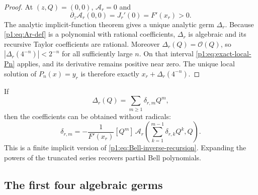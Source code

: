 \documentclass[11pt,oneside]{article}
\numberwithin{equation}{section}
\theoremstyle{definition}
\theoremstyle{remark}
\newcommand{\bigO}{\mathcal O}
\begin{document}
\begin{proof}
At $(z,Q)=(0,0)$, $\mathcal A_r=0$ and
\[
 \partial_z\mathcal A_r(0,0)=J_r'(0)=F'(x_r)>0.
\]
The analytic implicit-function theorem gives a unique analytic germ $\Delta_r$.
Because \eqref{p1:eq:Ar-def} is a polynomial with rational coefficients,
$\Delta_r$ is algebraic and its recursive Taylor coefficients are rational.
Moreover $\Delta_r(Q)=\bigO(Q)$, so
$|\Delta_r(4^{-n})|<2^{-n}$ for all sufficiently large $n$.  On that interval
\eqref{p1:eq:exact-local-Pn} applies, and its derivative remains positive near zero.
The unique local solution of $P_n(x)=y_r$ is therefore exactly
$x_r+\Delta_r(4^{-n})$.
\end{proof}

If
\begin{equation}
 \Delta_r(Q)=\sum_{m\ge1}\delta_{r,m}Q^m,
 \label{p1:eq:Delta-series}
\end{equation}
then the coefficients can be obtained without radicals:
\begin{equation}
 \boxed{
 \delta_{r,m}=-\frac1{F'(x_r)}[Q^m]\,
 \mathcal A_r\!\left(\sum_{k=1}^{m-1}\delta_{r,k}Q^k,Q\right).}
 \label{p1:eq:Delta-recursion}
\end{equation}
This is a finite implicit version of \eqref{p1:eq:Bell-inverse-recursion}.  Expanding the
powers of the truncated series recovers partial Bell polynomials.

\subsection{The first four algebraic germs}
\end{document}
